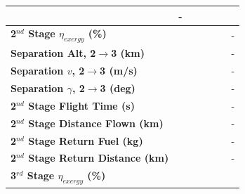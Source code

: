 \begin{table}[ht]
\begin{tabular}{l c c c c c c}
		& -
		\\
		\hline 
		\textbf{2$^{nd}$ Stage $\eta_{exergy}$ (\%)}
		& \textbf{\secondExergyEffISPThreeNinety}
		& \textbf{\secondExergyEffISPThreeNinetyFive}
		& \textbf{\secondExergyEffISPThreeStandard}
		& \textbf{\secondExergyEffISPThreeOneHundredFive}
		& \textbf{\secondExergyEffISPThreeOneHundredTen}
		& -
		\\
		\textbf{Separation Alt, 2$\rightarrow$3 (km)}
		& \secondthirdSeparationAltISPThreeNinety
		& \secondthirdSeparationAltISPThreeNinetyFive
		& \secondthirdSeparationAltISPThreeStandard
		& \secondthirdSeparationAltISPThreeOneHundredFive
		& \secondthirdSeparationAltISPThreeOneHundredTen
		& -
		\\
		\textbf{Separation $v$, 2$\rightarrow$3 (m/s)}
		& \secondthirdSeparationvISPThreeNinety
		& \secondthirdSeparationvISPThreeNinetyFive
		& \secondthirdSeparationvISPThreeStandard
		& \secondthirdSeparationvISPThreeOneHundredFive
		& \secondthirdSeparationvISPThreeOneHundredTen
		& -
		\\
		\textbf{Separation $\gamma$, 2$\rightarrow$3 (deg)}
		& \secondthirdSeparationgammaISPThreeNinety
		& \secondthirdSeparationgammaISPThreeNinetyFive
		& \secondthirdSeparationgammaISPThreeStandard
		& \secondthirdSeparationgammaISPThreeOneHundredFive
		& \secondthirdSeparationgammaISPThreeOneHundredTen
		& -
		\\
		\textbf{2$^{nd}$ Stage Flight Time (s)}
		& \secondFlightTimeISPThreeNinety
		& \secondFlightTimeISPThreeNinetyFive
		& \secondFlightTimeISPThreeStandard
		& \secondFlightTimeISPThreeOneHundredFive
		& \secondFlightTimeISPThreeOneHundredTen
		& -
		\\
		\textbf{2$^{nd}$ Stage Distance Flown (km)}
		& \SecondDistISPThreeNinety
		& \SecondDistISPThreeNinetyFive
		& \SecondDistISPThreeStandard
		& \SecondDistISPThreeOneHundredFive
		& \SecondDistISPThreeOneHundredTen
		& -
		\\
		\textbf{2$^{nd}$ Stage Return Fuel (kg)}
		& \returnFuelISPThreeNinety
		& \returnFuelISPThreeNinetyFive
		& \returnFuelISPThreeStandard
		& \returnFuelISPThreeOneHundredFive
		& \returnFuelISPThreeOneHundredTen
		& -
		\\
		\textbf{2$^{nd}$ Stage Return Distance (km)}
		& \returnDistISPThreeNinety
		& \returnDistISPThreeNinetyFive
		& \returnDistISPThreeStandard
		& \returnDistISPThreeOneHundredFive
		& \returnDistISPThreeOneHundredTen
		& -
		\\
		\hline 
		\textbf{3$^{rd}$ Stage $\eta_{exergy}$ (\%)}
		& \textbf{\thirddExergyEffISPThreeNinety}

\end{tabular}
\end{table}
